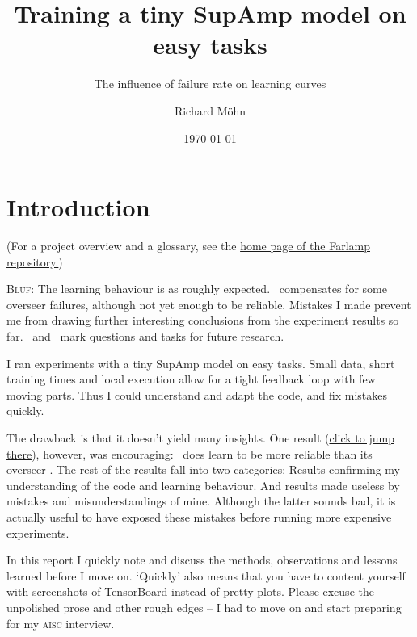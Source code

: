 \documentclass{farlamp}
\title{Training a tiny SupAmp model on easy tasks}
\subtitle{The influence of failure rate on learning curves}
\author{Richard Möhn}
\date{\today}
\begin{document}
\maketitle
\tableofcontents

\section{Introduction}

(For a project overview and a glossary, see the
\href{https://github.com/rmoehn/farlamp}{home page of the Farlamp repository.})

\textsc{Bluf}: The learning behaviour is as roughly expected. \Xpa\ compensates
for some overseer failures, although not yet enough to be reliable. Mistakes I
made prevent me from drawing further interesting conclusions from the experiment
results so far. \OQsymbol\ and \TODOsymbol\ mark questions and tasks for future
research.

I ran experiments with a tiny SupAmp model on easy tasks. Small data, short
training times and local execution allow for a tight feedback loop with few
moving parts. Thus I could understand and adapt the code, and fix mistakes
quickly.

The drawback is that it doesn't yield many insights. One result
(\hyperlink{interesting}{click to jump there}), however, was encouraging: \Xpa\
does learn to be more reliable than its overseer \AmpHp. The rest of the results
fall into two categories: Results confirming my understanding of the code and
learning behaviour. And results made useless by mistakes and misunderstandings
of mine. Although the latter sounds bad, it is actually useful to have exposed
these mistakes before running more expensive experiments.

In this report I quickly note and discuss the methods, observations and lessons
learned before I move on. ‘Quickly’ also means that you have to content yourself
with screenshots of TensorBoard instead of pretty plots. Please excuse the
unpolished prose and other rough edges – I had to move on and start preparing
for my \textsc{aisc} interview.


\end{document}
